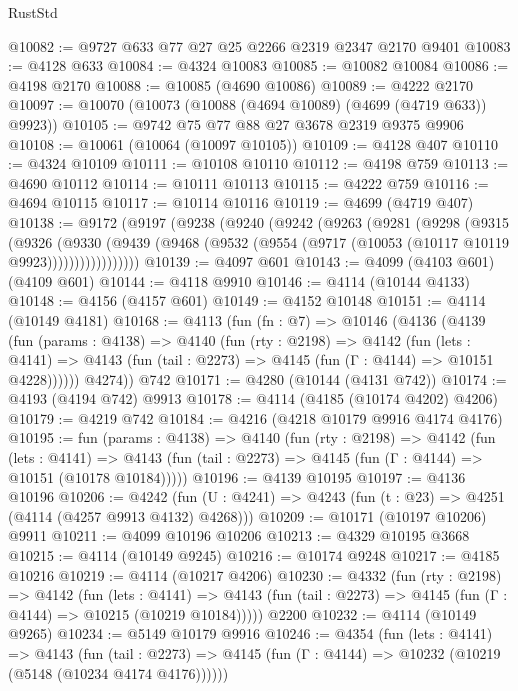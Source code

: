 \begin{lexlean}{RustStd}
\begin{coremodule}
{\begin{coremodule}
{{{{{{{{{{{{{{@10082 := @9727 @633 @77 @27 @25 @2266 @2319 @2347 @2170 @9401
@10083 := @4128 @633
@10084 := @4324 @10083
@10085 := @10082 @10084
@10086 := @4198 @2170
@10088 := @10085 (@4690 @10086)
@10089 := @4222 @2170
@10097 := @10070 (@10073 (@10088 (@4694 @10089) (@4699 (@4719 @633)) @9923))
@10105 := @9742 @75 @77 @88 @27 @3678 @2319 @9375 @9906
@10108 := @10061 (@10064 (@10097 @10105))
@10109 := @4128 @407
@10110 := @4324 @10109
@10111 := @10108 @10110
@10112 := @4198 @759
@10113 := @4690 @10112
@10114 := @10111 @10113
@10115 := @4222 @759
@10116 := @4694 @10115
@10117 := @10114 @10116
@10119 := @4699 (@4719 @407)
@10138 := @9172
    (@9197
      (@9238
        (@9240
          (@9242
            (@9263
              (@9281
                (@9298
                  (@9315
                    (@9326
                      (@9330
                        (@9439
                          (@9468 (@9532 (@9554 (@9717 (@10053 (@10117 @10119 @9923)))))))))))))))))
@10139 := @4097 @601
@10143 := @4099 (@4103 @601) (@4109 @601)
@10144 := @4118 @9910
@10146 := @4114 (@10144 @4133)
@10148 := @4156 (@4157 @601)
@10149 := @4152 @10148
@10151 := @4114 (@10149 @4181)
@10168 := @4113
    (fun (fn : @7) =>
    @10146
      (@4136
        (@4139
          (fun (params : @4138) =>
          @4140
            (fun (rty : @2198) =>
            @4142
              (fun (lets : @4141) =>
              @4143 (fun (tail : @2273) => @4145 (fun (Γ : @4144) => @10151 @4228))))))
        @4274))
    @742
@10171 := @4280 (@10144 (@4131 @742))
@10174 := @4193 (@4194 @742) @9913
@10178 := @4114 (@4185 (@10174 @4202) @4206)
@10179 := @4219 @742
@10184 := @4216 (@4218 @10179 @9916 @4174 @4176)
@10195 := fun (params : @4138) =>
  @4140
    (fun (rty : @2198) =>
    @4142
      (fun (lets : @4141) =>
      @4143 (fun (tail : @2273) => @4145 (fun (Γ : @4144) => @10151 (@10178 @10184)))))
@10196 := @4139 @10195
@10197 := @4136 @10196
@10206 := @4242
    (fun (U : @4241) => @4243 (fun (t : @23) => @4251 (@4114 (@4257 @9913 @4132) @4268)))
@10209 := @10171 (@10197 @10206) @9911
@10211 := @4099 @10196 @10206
@10213 := @4329 @10195 @3668
@10215 := @4114 (@10149 @9245)
@10216 := @10174 @9248
@10217 := @4185 @10216
@10219 := @4114 (@10217 @4206)
@10230 := @4332
    (fun (rty : @2198) =>
    @4142
      (fun (lets : @4141) =>
      @4143 (fun (tail : @2273) => @4145 (fun (Γ : @4144) => @10215 (@10219 @10184)))))
    @2200
@10232 := @4114 (@10149 @9265)
@10234 := @5149 @10179 @9916
@10246 := @4354
    (fun (lets : @4141) =>
    @4143
      (fun (tail : @2273) =>
      @4145 (fun (Γ : @4144) => @10232 (@10219 (@5148 (@10234 @4174 @4176))))))
}}}}}}}}}}}}}}
\end{coremodule}}
\end{coremodule}
\end{lexlean}
